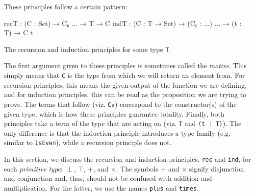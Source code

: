\documentclass[12pt]{article}
\begin{document}
These principles follow a certain pattern:
\begin{center}
\begin{minipage}{0.9\textwidth}
\begin{code}
recT : (C : Set) → C₀ ... → T → C
indT : (C : T → Set) → (C₀ : ...) ... → (t : T) → C t
\end{code}
\end{minipage}

\begin{minipage}{0.7\textwidth}
\begin{small}
The recursion and induction principles for some type {\tt T}.
\end{small}
\end{minipage}
\end{center}
The first argument given to these principles is sometimes called the {\em motive}.
This simply means that {\tt C} is the type from which we will return an element
from. For recursion principles, this means the given output of the function we
are defining, and for induction principles, this can be read as the proposition
we are trying to prove. The terms that follow (viz. {\tt C₀}) correspond to the
constructor(s) of the given type, which is how these principles guarantee
totality. Finally, both principles take a term of the type that are acting on
(viz. {\tt T} and {\tt (t : T)}). The only difference is that the induction
principle introduces a type family (e.g. similar to {\tt isEven}), while a
recursion principle does not. 

In this section, we discuss the recursion and induction principles, {\tt rec}
and {\tt ind}, for each {\em primitive type}: \(\perp\), \(\top\), +,
and \(\times\). The symbols + and \(\times\) signify disjunction and conjunction
and, thus, should not be confused with addition and multiplication. For the
latter, we use the names {\tt plus} and {\tt times}.
\end{document}

